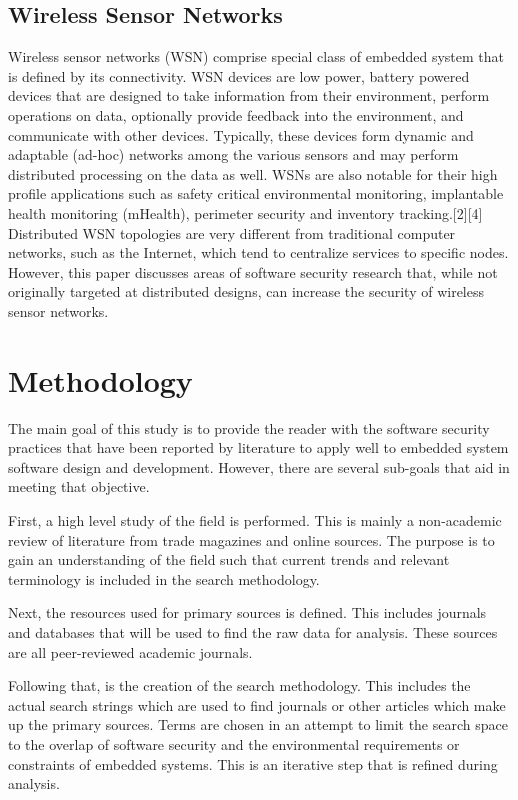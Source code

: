 \documentclass[final,conference,10pt]{IEEEtran}
\begin{document}
\subsection{Wireless Sensor Networks}

Wireless sensor networks (WSN) comprise special class of embedded system that is defined by its connectivity.  WSN devices are low power, battery powered devices that are designed to take information from their environment, perform operations on data, optionally provide feedback into the environment, and communicate with other devices.  Typically, these devices form dynamic and adaptable (ad-hoc) networks among the various sensors and may perform distributed processing on the data as well.  WSNs are also notable for their high profile applications such as safety critical environmental monitoring, implantable health monitoring (mHealth), perimeter security and inventory tracking.[2][4]  Distributed WSN topologies are very different from traditional computer networks, such as the Internet, which tend to centralize services to specific nodes. However, this paper discusses areas of software security research that, while not originally targeted at distributed designs, can increase the security of wireless sensor networks.

\section{Methodology}
The main goal of this study is to provide the reader with the software security practices that have been reported by literature to apply well to embedded system software design and development.  However, there are several sub-goals that aid in meeting that objective.  

First, a high level study of the field is performed.  This is mainly a non-academic review of literature from trade magazines and online sources. The purpose is to gain an understanding of the field such that current trends and relevant terminology is included in the search methodology.

Next, the resources used for primary sources is defined.  This includes journals and databases that will be used to find the raw data for analysis.  These sources are all peer-reviewed academic journals.

Following that, is the creation of the search methodology.  This includes the actual search strings which are used to find journals or other articles which make up the primary sources.  Terms are chosen in an attempt to limit the search space to the overlap of software security and the environmental requirements or constraints of embedded systems.  This is an iterative step that is refined during analysis.
\end{document}
